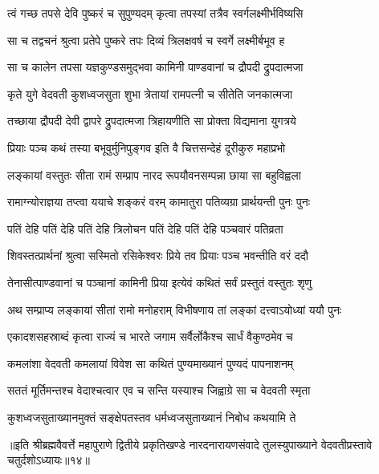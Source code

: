 \twolineshloka
{त्वं गच्छ तपसे देवि पुष्करं च सुपुण्यदम्}
{कृत्वा तपस्यां तत्रैव स्वर्गलक्ष्मीर्भविष्यसि}%

\twolineshloka
{सा च तद्वचनं श्रुत्वा प्रतेपे पुष्करे तपः}
{दिव्यं त्रिलक्षवर्ष च स्वर्गे लक्ष्मीर्बभूव ह}%

\twolineshloka
{सा च कालेन तपसा यज्ञकुण्डसमुद्भवा}
{कामिनी पाण्डवानां च द्रौपदी द्रुपदात्मजा}%

\twolineshloka
{कृते युगे वेदवती कुशध्वजसुता शुभा}
{त्रेतायां रामपत्नी च सीतेति जनकात्मजा}%

\twolineshloka
{तच्छाया द्रौपदी देवी द्वापरे द्रुपदात्मजा}
{त्रिहायणीति सा प्रोक्ता विद्यमाना युगत्रये}%


\twolineshloka
{प्रियाः पञ्च कथं तस्या बभूवुर्मुनिपुङ्गव}
{इति वै चित्तसन्देहं दूरीकुरु महाप्रभो}%


\twolineshloka
{लङ्कायां वस्तुतः सीता रामं सम्प्राप नारद}
{रूपयौवनसम्पन्ना छाया सा बहुविह्वला}%

\twolineshloka
{रामाग्न्योराज्ञया तप्त्वा ययाचे शङ्करं वरम्}
{कामातुरा पतिव्यग्रा प्रार्थयन्ती पुनः पुनः}%

\twolineshloka
{पतिं देहि पतिं देहि पतिं देहि त्रिलोचन}
{पतिं देहि पतिं देहि पञ्चवारं पतिव्रता}%

\twolineshloka
{शिवस्तत्प्रार्थनां श्रुत्वा सस्मितो रसिकेश्वरः}
{प्रिये तव प्रियाः पञ्च भवन्तीति वरं ददौ}%

\twolineshloka
{तेनासीत्पाण्डवानां च पञ्चानां कामिनी प्रिया}
{इत्येवं कथितं सर्वं प्रस्तुतं वस्तुतः शृणु}%

\twolineshloka
{अथ सम्प्राप्य लङ्कायां सीतां रामो मनोहराम्}
{विभीषणाय तां लङ्कां दत्त्वाऽयोध्यां ययौ पुनः}%

\twolineshloka
{एकादशसहस्राब्दं कृत्वा राज्यं च भारते}
{जगाम सर्वैर्लोकैश्च सार्धं वैकुण्ठमेव च}%

\twolineshloka
{कमलांशा वेदवती कमलायां विवेश सा}
{कथितं पुण्यमाख्यानं पुण्यदं पापनाशनम्}%

\twolineshloka
{सततं मूर्तिमन्तश्च वेदाश्चत्वार एव च}
{सन्ति यस्याश्च जिह्वाग्रे सा च वेदवती स्मृता}%

\twolineshloka
{कुशध्वजसुताख्यानमुक्तं सङ्क्षेपतस्तव}
{धर्मध्वजसुताख्यानं निबोध कथयामि ते}%

॥इति श्रीब्रह्मवैवर्त्ते महापुराणे द्वितीये प्रकृतिखण्डे नारदनारायणसंवादे तुलस्युपाख्याने वेदवतीप्रस्तावे चतुर्दशोऽध्यायः॥१४॥
